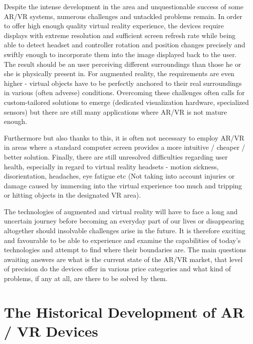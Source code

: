 \documentclass[12pt, a4paper]{article}
\begin{document}
Despite the intense development in the area and unquestionable success of some AR/VR systems, numerous challenges and untackled problems remain. In order to offer high enough quality virtual reality experience, the devices require displays with extreme resolution and sufficient screen refresh rate while being able to detect headset and controller rotation and position changes precisely and swiftly enough to incorporate them into the image displayed back to the user. The result should be an user perceiving different surroundings than those he or she is physically present in. For augmented reality, the requirements are even higher - virtual objects have to be perfectly anchored to their real surroundings in various (often adverse) conditions. Overcoming these challenges often calls for custom-tailored solutions to emerge (dedicated visualization hardware, specialized sensors) but there are still many applications where AR/VR is not mature enough. 

Furthermore but also thanks to this, it is often not necessary to employ AR/VR in areas where a standard computer screen provides a more intuitive / cheaper / better solution. Finally, there are still unresolved difficulties regarding user health, especially in regard to virtual reality headsets - motion sickness, disorientation, headaches, eye fatigue etc (Not taking into account injuries or damage caused by immersing into the virtual experience too much and tripping or hitting objects in the designated VR area).

The technologies of augmented and virtual reality will have to face a long and uncertain journey before becoming an everyday part of our lives or disappearing altogether should insolvable challenges arise in the future. It is therefore exciting and favourable to be able to experience and examine the capabilities of today’s technologies and attempt to find where their boundaries are. The main questions awaiting answers are what is the current state of the AR/VR market, that level of precision do the devices offer in various price categories and what kind of problems, if any at all, are there to be solved by them.

\section{The Historical Development of AR / VR Devices}
\end{document}
